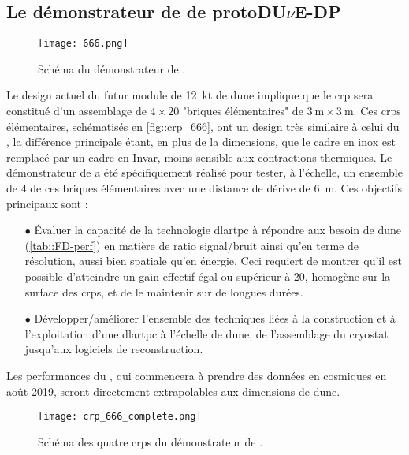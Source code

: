     \subsection{Le démonstrateur de \SSS{} de proto\texorpdfstring{DU$\nu$E}{DUNE}-DP}

      \begin{figure}[htbp]
        \centering
        \texttt{[image: 666.png]}        
        \caption[Schéma du démonstrateur de \SSS{}]{\label{fig::666}Schéma du démonstrateur de \SSS{}.}
      \end{figure}

      Le design actuel du futur module de \SI{12}{\kilo\tonne}\cite{Acciarri2016a} de \gls{dune} implique que le \gls{crp} sera constitué d'un assemblage de $4\times20$ "briques élémentaires" de $\SI{3}{\meter}\times\SI{3}{\meter}$. Ces \glspl{crp} élémentaires, schématisés en \autoref{fig::crp_666}, ont un design très similaire à celui du \TOO{}, la différence principale étant, en plus de la dimensions, que le cadre en inox est remplacé par un cadre en Invar, moins sensible aux contractions thermiques. Le démonstrateur de \SSS{} a été spécifiquement réalisé pour tester, à l'échelle, un ensemble de 4 de ces briques élémentaires avec une distance de dérive de \SI{6}{\meter}. Ces objectifs principaux sont :
      \begin{itemize}
        \item[$\bullet$] Évaluer la capacité de la technologie \gls{dlartpc} à répondre aux besoin de \gls{dune} (\autoref{tab::FD-perf}) en matière de ratio signal/bruit ainsi qu'en terme de résolution, aussi bien spatiale qu'en énergie. Ceci requiert de montrer qu'il est possible d'atteindre un gain effectif égal ou supérieur à 20, homogène sur la surface des \glspl{crp}, et de le maintenir sur de longues durées.
        \item[$\bullet$] Développer/améliorer l'ensemble des techniques liées à la construction et à l'exploitation d'une \gls{dlartpc} à l'échelle de \gls{dune}, de l'assemblage du cryostat jusqu'aux logiciels de reconstruction.
      \end{itemize}
      Les performances du \SSS{}, qui commencera à prendre des données en cosmiques en août 2019, seront directement extrapolables aux dimensions de \gls{dune}.

      \begin{figure}[htbp]
        \centering
        \texttt{[image: crp\_666\_complete.png]}
        \caption[Schéma des CRPs du \SSS{}]{\label{fig::crp_666}Schéma des quatre \glspl{crp} du démonstrateur de \SSS{}.}
      \end{figure}

